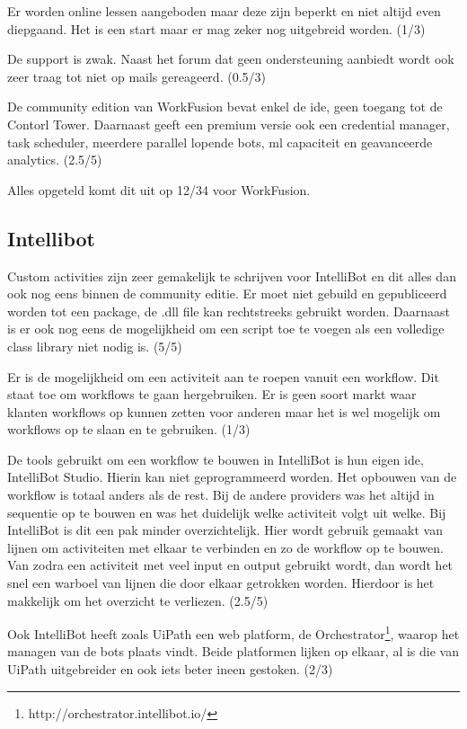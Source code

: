 Er worden online lessen aangeboden maar deze zijn beperkt en niet altijd even diepgaand. Het is een start maar er mag zeker nog uitgebreid worden. (1/3)

De support is zwak. Naast het forum dat geen ondersteuning aanbiedt wordt ook zeer traag tot niet op mails gereageerd. (0.5/3)

De community edition van WorkFusion bevat enkel de \acrshort{ide}, geen toegang tot de Contorl Tower. Daarnaast geeft een premium versie ook een credential manager, task scheduler, meerdere parallel lopende bots, \acrshort{ml} capaciteit en geavanceerde analytics. (2.5/5)

Alles opgeteld komt dit uit op 12/34 voor WorkFusion.

\subsection{Intellibot}

Custom activities zijn zeer gemakelijk te schrijven voor IntelliBot en dit alles dan ook nog eens binnen de community editie. Er moet niet gebuild en gepubliceerd worden tot een package, de .dll file kan rechtstreeks gebruikt worden. Daarnaast is er ook nog eens de mogelijkheid om een script toe te voegen als een volledige class library niet nodig is. (5/5)

Er is de mogelijkheid om een \gls{activiteit} aan te roepen vanuit een \gls{workflow}. Dit staat toe om \gls{workflow}s te gaan hergebruiken. Er is geen soort markt waar klanten \gls{workflow}s op kunnen zetten voor anderen maar het is wel mogelijk om \gls{workflow}s op te slaan en te gebruiken. (1/3)

De tools gebruikt om een \gls{workflow} te bouwen in IntelliBot is hun eigen \acrshort{ide}, IntelliBot Studio. Hierin kan niet geprogrammeerd worden. Het opbouwen van de \gls{workflow} is totaal anders als de rest. Bij de andere providers was het altijd in sequentie op te bouwen en was het duidelijk welke \gls{activiteit} volgt uit welke. Bij IntelliBot is dit een pak minder overzichtelijk. Hier wordt gebruik gemaakt van lijnen om \gls{activiteit}en met elkaar te verbinden en zo de \gls{workflow} op te bouwen. Van zodra een \gls{activiteit} met veel input en output gebruikt wordt, dan wordt het snel een warboel van lijnen die door elkaar getrokken worden. Hierdoor is het makkelijk om het overzicht te verliezen. (2.5/5)

Ook IntelliBot heeft zoals UiPath een web platform, de Orchestrator\footnote{http://orchestrator.intellibot.io/}, waarop het managen van de bots plaats vindt. Beide platformen lijken op elkaar, al is die van UiPath uitgebreider en ook iets beter ineen gestoken. (2/3)

